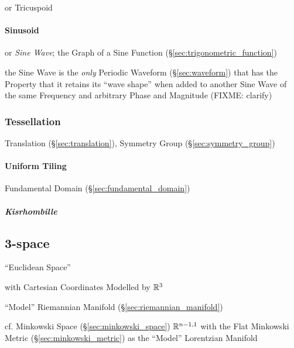 or Tricuspoid



\paragraph{Sinusoid}\label{sec:sinusoid}\hfill

or \emph{Sine Wave}; the Graph of a Sine Function
(\S\ref{sec:trigonometric_function})

the Sine Wave is the \emph{only} Periodic Waveform (\S\ref{sec:waveform}) that
has the Property that it retains its ``wave shape'' when added to another Sine
Wave of the same Frequency and arbitrary Phase and Magnitude (FIXME: clarify)



\subsubsection{Tessellation}\label{sec:tessellation}

\fist Translation (\S\ref{sec:translation}), Symmetry Group
(\S\ref{sec:symmetry_group})



\paragraph{Uniform Tiling}\label{sec:uniform_tiling}\hfill

Fundamental Domain (\S\ref{sec:fundamental_domain})



\subparagraph{Kisrhombille}\label{sec:kisrhombille}\hfill



\subsection{3-space}\label{sec:3_space}

``Euclidean Space''

with Cartesian Coordinates Modelled by $\mathbb{R}^3$

``Model'' Riemannian Manifold (\S\ref{sec:riemannian_manifold})

cf. Minkowski Space (\S\ref{sec:minkowski_space}) $\mathbb{R}^{n-1,1}$
with the Flat Minkowski Metric (\S\ref{sec:minkowski_metric}) as the
``Model'' Lorentzian Manifold



